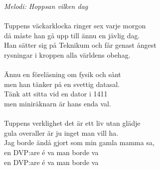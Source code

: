 {\footnotesize\textit{Melodi: Hoppsan vilken dag}}\\
\\
Tuppens väckarklocka ringer sex varje morgon\\
då måste han gå upp till ännu en jävlig dag.\\
Han sätter sig på Teknikum och får genast ångest\\
rysningar i kroppen alla världens obehag.\\
\\
Ännu en föreläsning om fysik och sånt\\
men han tänker på en svettig datasal.\\
Tänk att sitta vid en dator i 1411\\
men miniräknarn är hans enda val.\\
\\
Tuppens verklighet det är ett liv utan glädje\\
gula overaller är ju inget man vill ha.\\
Jag borde ändå gjort som min gamla mamma sa,\\
en DVP:are é va man borde va\\
\revrpt en DVP:are é va man borde va\rpt
